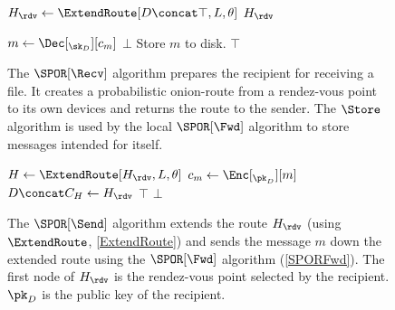 
\begin{figure}
  \begin{algorithmic}
      \State $H_\rdv\gets \ExtendRoute[D\concat \top, L, \theta]$
      \State \Return $H_\rdv$
    \EndFunction

      \State $m\gets \Dec[_{\sk_D}][c_m]$
        \State \Return $\bot$
      \EndIf
      \State Store $m$ to disk.
      \State \Return $\top$
    \EndFunction
  \end{algorithmic}
  \caption{\label{SPORRecv}%
    The \(\SPOR[\Recv]\) algorithm prepares the recipient for receiving a file.
    It creates a probabilistic onion-route from a rendez-vous point to its own 
    devices and returns the route to the sender.
    The \(\Store\) algorithm is used by the local \(\SPOR[\Fwd]\) algorithm to 
    store messages intended for itself.
  }
\end{figure}

\begin{figure}
  \begin{algorithmic}
      \State $H\gets \ExtendRoute[H_\rdv, L, \theta]$
      \State $c_m\gets \Enc[_{\pk_D}][m]$
      \State $D\concat C_H\gets H_\rdv$
          \State \Return $\top$
        \EndIf
      \EndFor
      \State \Return $\bot$
    \EndFunction
  \end{algorithmic}
  \caption{\label{SPORSend}%
    The \(\SPOR[\Send]\) algorithm extends the route \(H_\rdv\) (using 
    \(\ExtendRoute\), \cref{ExtendRoute}) and sends the message \(m\) down the 
    extended route using the \(\SPOR[\Fwd]\) algorithm (\cref{SPORFwd}).
    The first node of \(H_\rdv\) is the rendez-vous point selected by the 
    recipient.
    \(\pk_D\) is the public key of the recipient.
  }
\end{figure}

